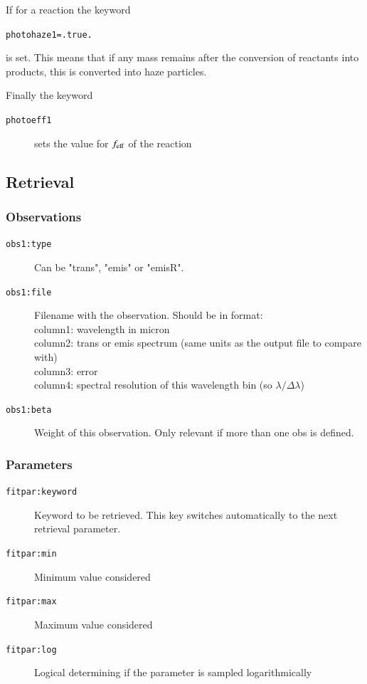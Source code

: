 \documentclass[12pt]{article}
\begin{document}
If for a reaction the keyword
\begin{description}
\item[\texttt{photohaze1=.true.}]
\end{description}
is set. This means that if any mass remains after the conversion of reactants into products, this is converted into haze particles.

Finally the keyword
\begin{description}
\item[\texttt{photoeff1}] sets the value for $f_{\rm eff}$ of the reaction
\end{description}

\subsection{Retrieval}

\subsubsection{Observations}

\begin{description}
\item[\texttt{obs1:type}]
Can be "trans", "emis" or "emisR".
\item[\texttt{obs1:file}]
Filename with the observation. Should be in format:\\
column1: wavelength in micron\\
column2: trans or emis spectrum (same units as the output file to compare with)\\
column3: error\\
column4: spectral resolution of this wavelength bin (so $\lambda/\Delta\lambda$)
\item[\texttt{obs1:beta}]
Weight of this observation. Only relevant if more than one obs is defined.
\end{description}

\subsubsection{Parameters}

\begin{description}
\item[\texttt{fitpar:keyword}]
Keyword to be retrieved. This key switches automatically to the next retrieval parameter.
\item[\texttt{fitpar:min}]
Minimum value considered
\item[\texttt{fitpar:max}]
Maximum value considered
\item[\texttt{fitpar:log}]
Logical determining if the parameter is sampled logarithmically
\end{description}
\end{document}
